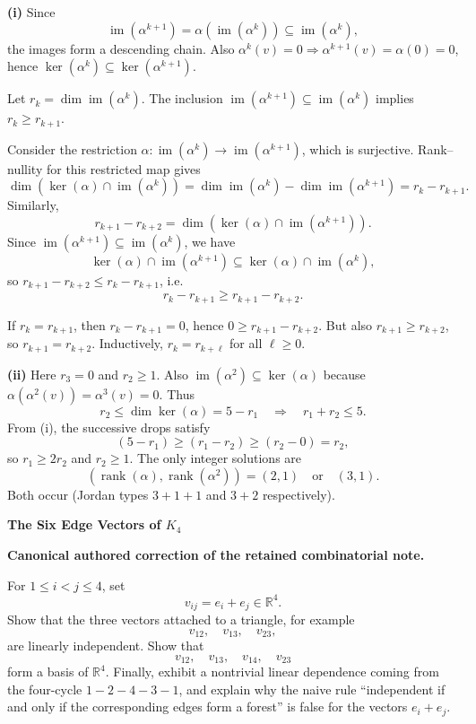 \begin{solution}
\textbf{(i)} Since
\[
\operatorname{im}(\alpha^{k+1})=\alpha(\operatorname{im}(\alpha^k))\subseteq \operatorname{im}(\alpha^k),
\]
the images form a descending chain. Also $\alpha^k(v)=0\Rightarrow \alpha^{k+1}(v)=\alpha(0)=0$, hence
$\ker(\alpha^k)\subseteq \ker(\alpha^{k+1})$.

Let $r_k=\dim\operatorname{im}(\alpha^k)$. The inclusion
$\operatorname{im}(\alpha^{k+1})\subseteq \operatorname{im}(\alpha^k)$ implies $r_k\ge r_{k+1}$.

Consider the restriction $\alpha:\operatorname{im}(\alpha^k)\to \operatorname{im}(\alpha^{k+1})$, which is surjective.
Rank--nullity for this restricted map gives
\[
\dim(\ker(\alpha)\cap \operatorname{im}(\alpha^k))
=\dim\operatorname{im}(\alpha^k)-\dim\operatorname{im}(\alpha^{k+1})
=r_k-r_{k+1}.
\]
Similarly,
\[
r_{k+1}-r_{k+2}=\dim(\ker(\alpha)\cap \operatorname{im}(\alpha^{k+1})).
\]
Since $\operatorname{im}(\alpha^{k+1})\subseteq \operatorname{im}(\alpha^k)$, we have
\[
\ker(\alpha)\cap \operatorname{im}(\alpha^{k+1})\subseteq \ker(\alpha)\cap \operatorname{im}(\alpha^k),
\]
so $r_{k+1}-r_{k+2}\le r_k-r_{k+1}$, i.e.
\[
r_k-r_{k+1}\ge r_{k+1}-r_{k+2}.
\]

If $r_k=r_{k+1}$, then $r_k-r_{k+1}=0$, hence $0\ge r_{k+1}-r_{k+2}$.
But also $r_{k+1}\ge r_{k+2}$, so $r_{k+1}=r_{k+2}$. Inductively, $r_k=r_{k+\ell}$ for all $\ell\ge 0$.

\medskip
\textbf{(ii)} Here $r_3=0$ and $r_2\ge 1$.
Also $\operatorname{im}(\alpha^2)\subseteq \ker(\alpha)$ because $\alpha(\alpha^2(v))=\alpha^3(v)=0$.
Thus
\[
r_2\le \dim\ker(\alpha)=5-r_1 \quad\Rightarrow\quad r_1+r_2\le 5.
\]
From (i), the successive drops satisfy
\[
(5-r_1)\ge (r_1-r_2)\ge (r_2-0)=r_2,
\]
so $r_1\ge 2r_2$ and $r_2\ge 1$.
The only integer solutions are
\[
(\operatorname{rank}(\alpha),\operatorname{rank}(\alpha^2))=(2,1)\quad\text{or}\quad(3,1).
\]
Both occur (Jordan types $3+1+1$ and $3+2$ respectively).
\end{solution}

\begin{problem}[CP-I-0057]
\label{prob:cp-i-0057}
\textbf{The Six Edge Vectors of \(K_4\)}

\textbf{Canonical authored correction of the retained combinatorial note.}

\hspace*{1.5em}For \(1\le i<j\le4\), set
\[
v_{ij}=e_i+e_j\in\mathbb R^4.
\]
Show that the three vectors attached to a triangle, for example
\[
v_{12},\quad v_{13},\quad v_{23},
\]
are linearly independent. Show that
\[
v_{12},\quad v_{13},\quad v_{14},\quad v_{23}
\]
form a basis of \(\mathbb R^4\). Finally, exhibit a nontrivial linear dependence coming from the
four-cycle \(1-2-4-3-1\), and explain why the naive rule
``independent if and only if the corresponding edges form a forest'' is false for the vectors
\(e_i+e_j\).
\end{problem}

